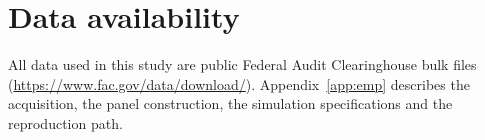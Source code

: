 \section*{Data availability}

All data used in this study are public Federal Audit Clearinghouse bulk files
(\url{https://www.fac.gov/data/download/}). Appendix~\ref{app:emp} describes
the acquisition, the panel construction, the simulation specifications and the
reproduction path.
